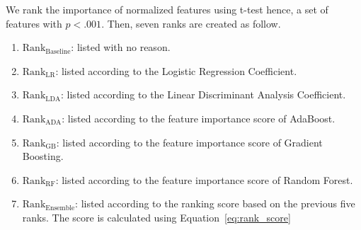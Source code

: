 \documentclass[pdflatex,sn-mathphys]{sn-jnl}%
\theoremstyle{thmstyleone}%
\theoremstyle{thmstyletwo}%
\theoremstyle{thmstylethree}%
\begin{document}
We rank the importance of normalized features using t-test hence, a set of features with $p < .001$. Then, seven ranks are created as follow.



\begin{enumerate}
    \item $\text{Rank}_{\text{Baseline}}$: listed with no reason.
    \item $\text{Rank}_{\text{LR}}$: listed according to the Logistic Regression Coefficient.
    \item $\text{Rank}_{\text{LDA}}$: listed according to the Linear Discriminant Analysis Coefficient.
    \item $\text{Rank}_{\text{ADA}}$: listed according to the feature importance score of AdaBoost.
    \item $\text{Rank}_{\text{GB}}$: listed according to the feature importance score of Gradient Boosting.
    \item $\text{Rank}_{\text{RF}}$: listed according to the feature importance score of Random Forest.
    \item $\text{Rank}_{\text{Ensemble}}$: listed according to the ranking score based on the previous five ranks. The score is calculated using Equation~\ref{eq:rank_score}
\end{enumerate}
\end{document}
